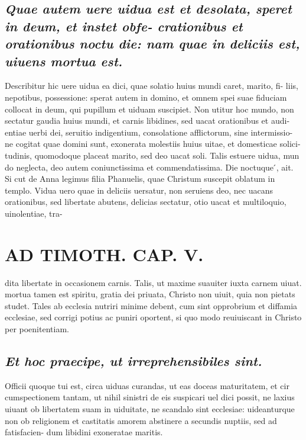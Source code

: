 \documentclass{article}
\begin{document}
\begin{pages}
\subsection*{\textit{Quae autem uere uidua est et desolata, speret in deum, et instet obfe- crationibus et orationibus noctu die: nam quae in deliciis est, uiuens mortua est. }}\pstart Describitur hic uere uidua ea dici, quae solatio huius mundi caret, marito, fi- liis, nepotibus, possessione: sperat autem in domino, et omnem spei suae fiduciam collocat in deum, qui pupillum et uiduam suscipiet. Non utitur hoc mundo, non sectatur gaudia huius mundi, et carnis libidines, sed uacat orationibus et audi- entiae uerbi dei, seruitio indigentium, consolatione afflictorum, sine intermissio- ne cogitat quae domini sunt, exonerata molestiis huius uitae, et domesticae solici- tudinis, quomodoque placeat marito, sed deo uacat soli. Talis estuere uidua, mun do neglecta, deo autem coniunctissima et commendatissima. Die noctuque ́, ait. Si cut de Anna legimus filia Phanuelis, quae Christum suscepit oblatum in templo. Vidua uero quae in deliciis uersatur, non seruiens deo, nec uacans orationibus, sed libertate abutens, delicias sectatur, otio uacat et multiloquio, uinolentiae, tra-  \pend
\section*{AD TIMOTH. CAP. V. }
\marginpar{[ p.515 ]}\pstart dita libertate in occasionem carnis. Talis, ut maxime suauiter iuxta carnem uiuat. mortua tamen est spiritu, gratia dei priuata, Christo non uiuit, quia non pietats studet. Tales ab ecclesia nutriri minime debent, cum sint opprobrium et diffamia ecclesiae, sed corrigi potius ac puniri oportent, si quo modo reuiuiscant in Christo per poenitentiam.  \pend
{}
{}
\subsection*{\textit{Et hoc praecipe, ut irreprehensibiles sint. }}\pstart Officii quoque tui est, circa uiduas curandas, ut eas doceas maturitatem, et cir cumspectionem tantam, ut nihil sinistri de eis suspicari uel dici possit, ne laxius uiuant ob libertatem suam in uiduitate, ne scandalo sint ecclesiae: uideanturque non ob religionem et castitatis amorem abstinere a secundis nuptiis, sed ad fatisfacien- dum libidini exoneratae maritis.  \pend
{}
{}

\end{pages}
\end{document}
